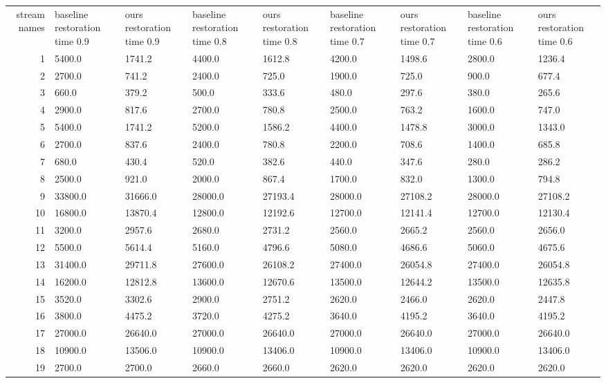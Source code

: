 \begin{tabular}{|r|l|l|l|l|l|l|l|l|}
  \hline
  stream names & baseline restoration time 0.9 & ours restoration time 0.9 & baseline restoration time 0.8 & ours restoration time 0.8 & baseline restoration time 0.7 & ours restoration time 0.7 & baseline restoration time 0.6 & ours restoration time 0.6 \\ 
  1 & 5400.0 & 1741.2 & 4400.0 & 1612.8 & 4200.0 & 1498.6 & 2800.0 & 1236.4 \\ 
  2 & 2700.0 & 741.2 & 2400.0 & 725.0 & 1900.0 & 725.0 & 900.0 & 677.4 \\ 
  3 & 660.0 & 379.2 & 500.0 & 333.6 & 480.0 & 297.6 & 380.0 & 265.6 \\ 
  4 & 2900.0 & 817.6 & 2700.0 & 780.8 & 2500.0 & 763.2 & 1600.0 & 747.0 \\ 
  5 & 5400.0 & 1741.2 & 5200.0 & 1586.2 & 4400.0 & 1478.8 & 3000.0 & 1343.0 \\ 
  6 & 2700.0 & 837.6 & 2400.0 & 780.8 & 2200.0 & 708.6 & 1400.0 & 685.8 \\ 
  7 & 680.0 & 430.4 & 520.0 & 382.6 & 440.0 & 347.6 & 280.0 & 286.2 \\ 
  8 & 2500.0 & 921.0 & 2000.0 & 867.4 & 1700.0 & 832.0 & 1300.0 & 794.8 \\ 
  9 & 33800.0 & 31666.0 & 28000.0 & 27193.4 & 28000.0 & 27108.2 & 28000.0 & 27108.2 \\ 
  10 & 16800.0 & 13870.4 & 12800.0 & 12192.6 & 12700.0 & 12141.4 & 12700.0 & 12130.4 \\ 
  11 & 3200.0 & 2957.6 & 2680.0 & 2731.2 & 2560.0 & 2665.2 & 2560.0 & 2656.0 \\ 
  12 & 5500.0 & 5614.4 & 5160.0 & 4796.6 & 5080.0 & 4686.6 & 5060.0 & 4675.6 \\ 
  13 & 31400.0 & 29711.8 & 27600.0 & 26108.2 & 27400.0 & 26054.8 & 27400.0 & 26054.8 \\ 
  14 & 16200.0 & 12812.8 & 13600.0 & 12670.6 & 13500.0 & 12644.2 & 13500.0 & 12635.8 \\ 
  15 & 3520.0 & 3302.6 & 2900.0 & 2751.2 & 2620.0 & 2466.0 & 2620.0 & 2447.8 \\ 
  16 & 3800.0 & 4475.2 & 3720.0 & 4275.2 & 3640.0 & 4195.2 & 3640.0 & 4195.2 \\ 
  17 & 27000.0 & 26640.0 & 27000.0 & 26640.0 & 27000.0 & 26640.0 & 27000.0 & 26640.0 \\ 
  18 & 10900.0 & 13506.0 & 10900.0 & 13406.0 & 10900.0 & 13406.0 & 10900.0 & 13406.0 \\ 
  19 & 2700.0 & 2700.0 & 2660.0 & 2660.0 & 2620.0 & 2620.0 & 2620.0 & 2620.0 \\ 

\end{tabular}
